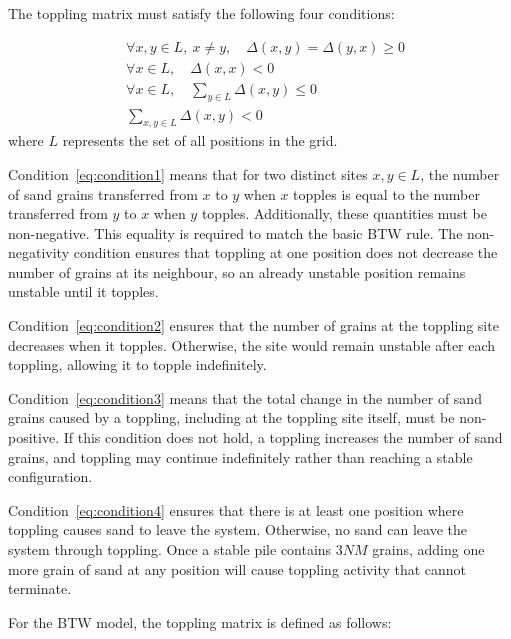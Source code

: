 The toppling matrix must satisfy the following four conditions: 

\begin{align}
	&\forall x,y\in L,\ x\ne y,\quad
	\Delta(x,y)=\Delta(y,x)\geq 0
	\tag{1}\label{eq:condition1}\\
	&\forall x\in L,\quad \Delta(x,x)<0
	\tag{2}\label{eq:condition2}\\
	&\forall x\in L,\quad \sum_{y\in L}\Delta(x,y)\leq 0
	\tag{3}\label{eq:condition3}\\
	&\sum_{x,y\in L}\Delta(x,y)<0
	\tag{4}\label{eq:condition4}
\end{align}
where $L$ represents the set of all positions in the grid.

Condition~\eqref{eq:condition1} means that for two distinct sites $x,y\in L$, the number of sand grains transferred from $x$ to $y$ when $x$ topples is equal to the number transferred from $y$ to $x$ when $y$ topples. Additionally, these quantities must be non-negative. This equality is required to match the basic BTW rule. The non-negativity condition ensures that toppling at one position does not decrease the number of grains at its neighbour, so an already unstable position remains unstable until it topples.

Condition~\eqref{eq:condition2} ensures that the number of grains at the toppling site decreases when it topples. Otherwise, the site would remain unstable after each toppling, allowing it to topple indefinitely.

Condition~\eqref{eq:condition3} means that the total change in the number of sand grains caused by a toppling, including at the toppling site itself, must be non-positive. If this condition does not hold, a toppling increases the number of sand grains, and toppling may continue indefinitely rather than reaching a stable configuration.

Condition~\eqref{eq:condition4} ensures that there is at least one position where toppling causes sand to leave the system. Otherwise, no sand can leave the system through toppling. Once a stable pile contains $3NM$ grains, adding one more grain of sand at any position will cause toppling activity that cannot terminate.

\newpage
For the BTW model, the toppling matrix is defined as follows:


